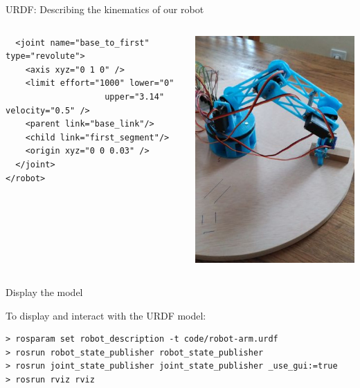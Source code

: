 \documentclass[compress]{beamer}
\begin{document}
\begin{frame}[fragile]{URDF: Describing the kinematics of our robot}
\begin{columns}
\begin{column}{0.5\linewidth}
\begin{overprint}
\begin{verbatim}
  <joint name="base_to_first" type="revolute">
    <axis xyz="0 1 0" />
    <limit effort="1000" lower="0"
                    upper="3.14" velocity="0.5" />
    <parent link="base_link"/>
    <child link="first_segment"/>
    <origin xyz="0 0 0.03" />
  </joint>
</robot>
\end{verbatim}

    \end{overprint}
        \end{column}
        \begin{column}{0.5\linewidth}
            \begin{center}
                \includegraphics[width=0.8\linewidth]{servo-arm2-narrow}
            \end{center}
        \end{column}
    \end{columns}
\end{frame}


\begin{frame}[fragile]{Display the model}

    To display and interact with the URDF model:

    \begin{verbatim}
> rosparam set robot_description -t code/robot-arm.urdf
> rosrun robot_state_publisher robot_state_publisher
> rosrun joint_state_publisher joint_state_publisher _use_gui:=true
> rosrun rviz rviz
\end{verbatim}
\end{frame}
\end{document}
